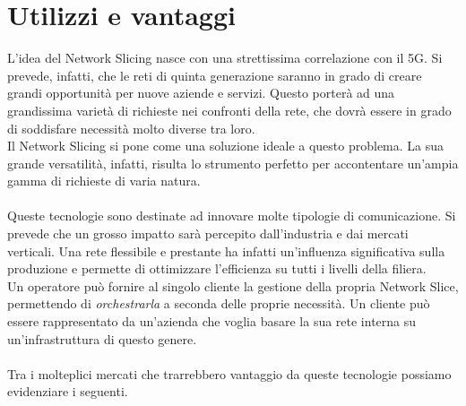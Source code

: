 \section{Utilizzi e vantaggi}\label{ch:1.3}
L'idea del Network Slicing nasce con una strettissima correlazione con il 5G. Si prevede, infatti, che le reti di quinta generazione saranno in grado di creare grandi opportunità per nuove aziende e servizi. Questo porterà ad una grandissima varietà di richieste nei confronti della rete, che dovrà essere in grado di soddisfare necessità molto diverse tra loro.\\
Il Network Slicing si pone come una soluzione ideale a questo problema. La sua grande versatilità, infatti, risulta lo strumento perfetto per accontentare un'ampia gamma di richieste di varia natura. \cite{NS5g}\\\\
Queste tecnologie sono destinate ad innovare molte tipologie di comunicazione. Si prevede che un grosso impatto sarà percepito dall'industria e dai mercati verticali. Una rete flessibile e prestante ha infatti un'influenza significativa sulla produzione e permette di ottimizzare l'efficienza su tutti i livelli della filiera.\\
Un operatore può fornire al singolo cliente la gestione della propria Network Slice, permettendo di \textit{orchestrarla} a seconda delle proprie necessità. Un cliente può essere rappresentato da un'azienda che voglia basare la sua rete interna su un'infrastruttura di questo genere.\\\\
Tra i molteplici mercati che trarrebbero vantaggio da queste tecnologie possiamo evidenziare i seguenti.
